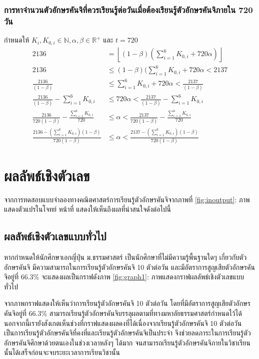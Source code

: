 \documentclass{article}
\begin{document}
\subsubsection{การหาจำนวนตัวอักษรคันจิที่ควรเรียนรู้ต่อวันเมื่อต้องเรียนรู้ตัวอักษรคันจิภายใน 720 วัน}
กำหนดให้ $ K_i , K_{0,i} \in \mathbb{N} , \alpha , \beta \in \mathbb{R}^+ $ และ $t = 720$
\begin{align*}
2136 & = \left\lfloor(1 - \beta)(\sum_{i=1}^{6} K_{0,i} + 720\alpha)\right\rfloor\ \\
2136 & \leq (1 - \beta)(\sum_{i=1}^{6} K_{0,i} + 720\alpha < 2137 \\
\frac{2136}{(1 - \beta)} & \leq \sum_{i=1}^{6} K_{0,i} + 720\alpha < \frac{2137}{(1 - \beta)} \\
\frac{2136}{(1 - \beta)} - \sum_{i=1}^{6} K_{0,i} & \leq 720\alpha < \frac{2137}{(1 - \beta)} - \sum_{i=1}^{6} K_{0,i} \\
\frac{2136}{720(1 - \beta)} - \frac{\sum_{i=1}^{6} K_{0,i}}{720} & \leq \alpha < \frac{2137}{720(1 - \beta)} - \frac{\sum_{i=1}^{6} K_{0,i}}{720} \\ 
\frac{2136 - (\sum_{i=1}^{6} K_{0,i})(1 - \beta)}{720(1 - \beta)} & \leq \alpha < \frac{2137 - (\sum_{i=1}^{6} K_{0,i})(1 - \beta)}{720(1 - \beta)}
\end{align*}

\section{ผลลัพธ์เชิงตัวเลข}
จากการทดสอบแบบจำลองทางคณิตศาสตร์การเรียนรู้ตัวอักษรคันจิจากภาพที่ \ref{fig:inoutput}: ภาพแสดงตัวแปรในโจทย์ หน้าที่ \pageref{fig:inoutput} แสดงให้เห็นถึงผลที่น่าสนใจดังต่อไปนี้

\subsection{ผลลัพธ์เชิงตัวเลขแบบทั่วไป}
หากกำหนดให้นักศึกษาเอกญี่ปุ่น ม.ธรรมศาสตร์ เป็นนักศึกษาที่ไม่มีความรู้พื้นฐานใดๆ เกี่ยวกับตัวอักษรคันจิ มีความสามารถในการเรียนรู้ตัวอักษรคันจิ 10 ตัวต่อวัน และมีอัตราการสูญเสียตัวอักษรคันจิอยู่ที่ 66.3\%\cite{ebbinghaus1913memory} จะแสดงผลเป็นกราฟดังภาพ \ref{fig:graph1}: ภาพแสดงกราฟผลลัพธ์เชิงตัวเลขแบบทั่วไป

จากภาพกราฟแสดงให้เห็นว่าการเรียนรู้ตัวอักษรคันจิ 10 ตัวต่อวัน โดยที่มีอัตราการสูญเสียตัวอักษรคันจิอยู่ที่ 66.3\%\cite{ebbinghaus1913memory} สามารถเรียนรู้ตัวอักษรคันจิบรรลุผลตามที่ทางมหาลัยธรรมศาสตร์กำหนดไว้ได้ นอกจากนี้เรายังสังเกตเห็นช่วงที่กราฟแสดงผลคงที่ได้เนื่องจากเรียนรู้ตัวอักษรคันจิ 10 ตัวต่อวัน เป็นการเรียนรู้ตัวอักษรคันจิที่คงที่และเรียนรู้ตัวอักษรคันจิเป็นประจำ จึงช่วยลดภาระในการเรียนรู้ตัวอักษรคันจิศึกษาด้วยตนเองในช่วงเวลาหลังๆ ได้มาก จนสามารถเรียนรู้ตัวอักษรคันจิภายในวิชาเรียนนั้นได้เสร็จก่อนจะจบระยะเวลาการเรียนวิชานั้น
\end{document}
